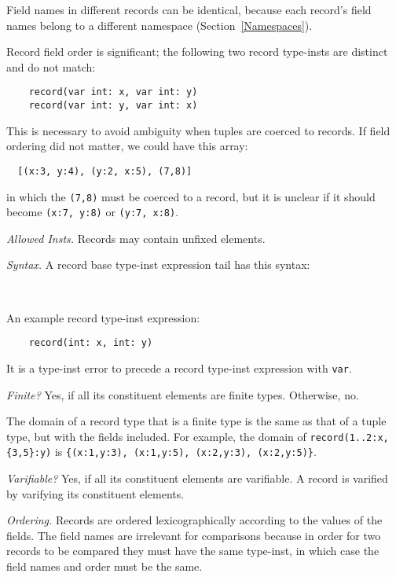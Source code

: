 \documentclass[10pt]{scrartcl}
\newcommand{\TyThing}[1]{\vspace{1.2mm}\noindent\emph{#1} }
\newcommand{\TyInsts}{\TyThing{Allowed Insts.}}
\newcommand{\TySyntax}{\TyThing{Syntax.}}
\newcommand{\TyFiniteType}{\TyThing{Finite?}}
\newcommand{\TyVarifiable}{\TyThing{Varifiable?}}
\newcommand{\TyOrdering}{\TyThing{Ordering.}}
\begin{document}
{Field names in different records can be identical, because each record's
field names belong to a different namespace (Section~\ref{Namespaces}).

Record field order is significant;  the following two record type-insts are
distinct and do not match:
\begin{verbatim}
    record(var int: x, var int: y)
    record(var int: y, var int: x)
\end{verbatim}

\begin{RationaleEnv}
This is necessary to avoid ambiguity when tuples are coerced to records.
If field ordering did not matter, we could have this array:
\begin{small}
\begin{verbatim}
  [(x:3, y:4), (y:2, x:5), (7,8)]
\end{verbatim}
\end{small}
in which the \texttt{(7,8)} must be coerced to a record, but it is unclear
if it should become \texttt{(x:7, y:8)} or \texttt{(y:7, x:8)}.
\end{RationaleEnv}

\TyInsts
Records may contain unfixed elements.

\TySyntax
A record base type-inst expression tail has this syntax:
\begin{productions}
    \RuleRecordTIExprTail \\
    \RuleTIExprAndId
\end{productions}
An example record type-inst expression:
\begin{verbatim}
    record(int: x, int: y)
\end{verbatim}
It is a type-inst error to precede a record type-inst expression with
\texttt{var}.

\TyFiniteType
Yes, if all its constituent elements are finite types.  Otherwise, no.

The domain of a record type that is a finite type is the same as that of a
tuple type, but with the fields included.  For example, the domain of
\texttt{record(1..2:x, \{3,5\}:y)} is
\verb+{(x:1,y:3), (x:1,y:5), (x:2,y:3), (x:2,y:5)}+.

\TyVarifiable
Yes, if all its constituent elements are varifiable.  A record is varified
by varifying its constituent elements.

\TyOrdering
Records are ordered lexicographically according to the values of the fields.
The field names are irrelevant for comparisons because in order for two
records to be compared they must have the same type-inst, in which case the
field names and order must be the same.

}
\end{document}
